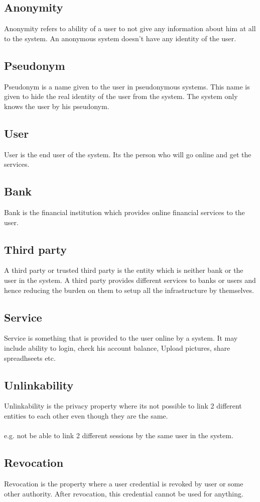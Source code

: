 \subsection{Anonymity}
Anonymity refers to ability of a user to not give any information about him at all to the system. An anonymous system doesn't have any identity of the user.
\subsection{Pseudonym}
Pseudonym is a name given to the user in pseudonymous systems. This name is given to hide the real identity of the user from the system. The system only knows the user by his pseudonym.
\subsection{User}
User is the end user of the system. Its the person who will go online and get the services.
\subsection{Bank}
Bank is the financial institution which provides online financial services to the user. 
\subsection{Third party}
A third party or trusted third party is the entity which is neither bank or the user in the system. A third party provides different services to banks or users and hence reducing the burden on them to setup all the infrastructure by themselves.
\subsection{Service}
Service is something that is provided to the user online by a system. It may include ability to login, check his account balance, Upload pictures, share spreadhseets etc.
\subsection{Unlinkability}
Unlinkability is the privacy property where its not possible to link 2 different entities to each other even though they are the same. 
\\
\\e.g. not be able to link 2 different sessions by the same user in the system.
\subsection{Revocation}
Revocation is the property where a user credential is revoked by user or some other authority. After revocation, this credential cannot be used for anything.
